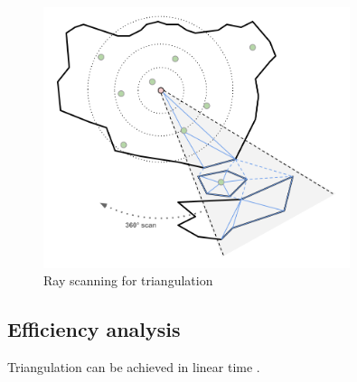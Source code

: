 \documentclass[a4paper,11pt]{article}
\begin{document}
\begin{figure}[h!]
  \centering
  \includegraphics[width=0.8\textwidth]{scan.png}
  \caption{Ray scanning for triangulation}
  \label{scan}
\end{figure}

\subsection{Efficiency analysis}
Triangulation can be achieved in linear time \cite{chazelle}.

\FloatBarrier
\nocite{*}


\end{document}
